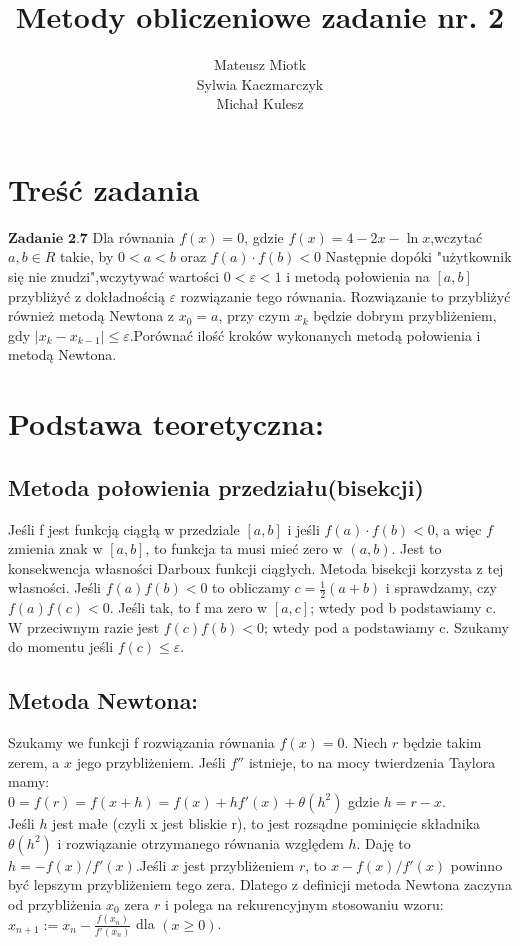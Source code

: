 \documentclass[11pt]{article} %
\title{Metody obliczeniowe zadanie nr. 2}
\author{Mateusz Miotk \\ Sylwia Kaczmarczyk \\ Michał Kulesz}
\date{} %
\begin{document}
\maketitle

\section{Treść zadania}

$\textbf {Zadanie 2.7}$ Dla równania $f(x) = 0$, gdzie $f(x)=4-2x-\ln x$,wczytać $ a,b \in R$ takie, by $0<a<b$ oraz $f(a)\cdot f(b)<0$ Następnie dopóki "użytkownik się nie znudzi",wczytywać wartości $0<\varepsilon<1 $ i metodą połowienia na $[a,b]$ przybliżyć z dokładnością $\varepsilon$ rozwiązanie tego równania. Rozwiązanie to przybliżyć również metodą Newtona z $x_0=a$, przy czym $x_k$ będzie dobrym przybliżeniem, gdy $|x_k-x_{k-1}|\le \varepsilon$.Porównać ilość kroków wykonanych metodą połowienia i metodą Newtona. 

\section {Podstawa teoretyczna:}
\subsection{Metoda połowienia przedziału(bisekcji)}
Jeśli f jest funkcją ciągłą w przedziale $[a,b]$ i jeśli $f(a) \cdot f(b) < 0 $, a więc $f$ zmienia znak w $[a,b]$, to funkcja ta musi mieć zero w $(a,b)$. Jest to konsekwencja własności Darboux funkcji ciągłych. Metoda bisekcji korzysta z tej własności. Jeśli $f(a)f(b) < 0 $ to obliczamy $c=\frac{1}{2}(a+b)$ i sprawdzamy, czy $f(a)f(c) < 0$. Jeśli tak, to f ma zero w $[a,c]$; wtedy pod b podstawiamy c. W przeciwnym razie jest $f(c)f(b) < 0$; wtedy pod a podstawiamy c. Szukamy do momentu jeśli  $f(c) \le \varepsilon.$ 
\subsection{Metoda Newtona:}
Szukamy we funkcji f rozwiązania równania $f(x)=0$. Niech $r$ będzie takim zerem, a $x$ jego przybliżeniem. Jeśli $f''$ istnieje, to na mocy twierdzenia Taylora mamy: \\
$0=f(r)=f(x+h)=f(x)+hf'(x) + \theta(h^2)$
gdzie $h=r-x$.\\ Jeśli $h$ jest małe (czyli x jest bliskie r), to jest rozsądne pominięcie składnika $\theta(h^2)$ i rozwiązanie otrzymanego równania względem $h$. Daję to $h=-f(x)/f'(x)$.Jeśli $x$ jest przybliżeniem $r$, to $x-f(x)/f'(x)$ powinno być lepszym przybliżeniem tego zera. Dlatego z definicji metoda Newtona zaczyna od przybliżenia $x_0$ zera $r$ i polega na rekurencyjnym stosowaniu wzoru:\\
$x_{n+1}:=x_n - \frac{f(x_n)}{f'(x_n)}$ dla $(x\ge 0)$.
\end{document}
